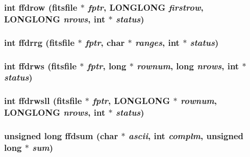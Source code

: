 \subsubsection{\setlength{\rightskip}{0pt plus 5cm}int ffdrow (\bf{fitsfile} $\ast$ {\em fptr}, \bf{LONGLONG} {\em firstrow}, \bf{LONGLONG} {\em nrows}, int $\ast$ {\em status})}\label{src_2fitsio_8h_9012004200b2e01ba5202319cac22a3d}


\subsubsection{\setlength{\rightskip}{0pt plus 5cm}int ffdrrg (\bf{fitsfile} $\ast$ {\em fptr}, char $\ast$ {\em ranges}, int $\ast$ {\em status})}\label{src_2fitsio_8h_193b5d6c2d1fd0dec8af3d08a1156120}


\subsubsection{\setlength{\rightskip}{0pt plus 5cm}int ffdrws (\bf{fitsfile} $\ast$ {\em fptr}, long $\ast$ {\em rownum}, long {\em nrows}, int $\ast$ {\em status})}\label{src_2fitsio_8h_450ce3d96ff7a288a6a85572eb3ea833}


\subsubsection{\setlength{\rightskip}{0pt plus 5cm}int ffdrwsll (\bf{fitsfile} $\ast$ {\em fptr}, \bf{LONGLONG} $\ast$ {\em rownum}, \bf{LONGLONG} {\em nrows}, int $\ast$ {\em status})}\label{src_2fitsio_8h_d372e6246c6c053a226a374967abb0c2}


\subsubsection{\setlength{\rightskip}{0pt plus 5cm}unsigned long ffdsum (char $\ast$ {\em ascii}, int {\em complm}, unsigned long $\ast$ {\em sum})}\label{src_2fitsio_8h_92ef99105023242d9d89231c60960911}


